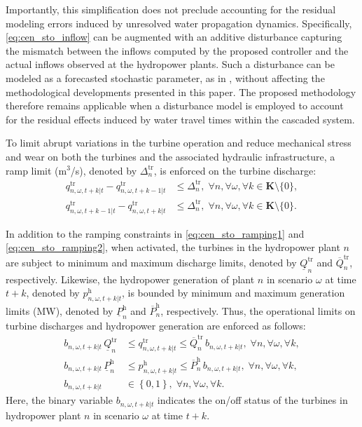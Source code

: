 \documentclass[a4paper,fleqn]{cas-sc}
\begin{document}
Importantly, this simplification does not preclude accounting for the residual modeling errors induced by unresolved water propagation dynamics.
Specifically, \eqref{eq:cen_sto_inflow} can be augmented with an additive disturbance capturing the mismatch between the inflows computed by the proposed controller and the actual inflows observed at the hydropower plants.
Such a disturbance can be modeled as a forecasted stochastic parameter, as in \cite{wu2025multi},
without affecting the methodological developments presented in this paper.
The proposed methodology therefore remains applicable when a disturbance model is employed to account for the residual effects induced by water travel times within the cascaded system.

To limit abrupt variations in the turbine operation and reduce mechanical stress and wear on both the turbines and the associated hydraulic infrastructure, a ramp limit (m$^3$/s), denoted by $\Delta^{\mathrm{tr}}_{n}$, is enforced on the turbine discharge:
\begin{align}
    q^{\mathrm{tr}}_{n, \omega, t+k|t} - q^{\mathrm{tr}}_{n, \omega, t+k-1|t} & \leq \Delta^{\mathrm{tr}}_{n}, \; \forall n, \forall \omega, \forall k \in \boldsymbol{K} \setminus \{0\}, \label{eq:cen_sto_ramping1}\\
    q^{\mathrm{tr}}_{n, \omega, t+k-1|t} - q^{\mathrm{tr}}_{n, \omega, t+k|t} & \leq \Delta^{\mathrm{tr}}_{n}, \; \forall n, \forall \omega, \forall k \in \boldsymbol{K} \setminus \{0\}. \label{eq:cen_sto_ramping2}
\end{align}

In addition to the ramping constraints in \eqref{eq:cen_sto_ramping1} and \eqref{eq:cen_sto_ramping2}, when activated, the turbines in the hydropower plant $n$ are subject to minimum and maximum discharge limits, denoted by $\underline{Q}^{\mathrm{tr}}_{n}$ and $\overline{Q}^{\mathrm{tr}}_{n}$, respectively.
Likewise, the hydropower generation of plant $n$ in scenario $\omega$ at time $t+k$, denoted by $p^{\mathrm{h}}_{n,\omega,t+k|t}$,
is bounded by minimum and maximum generation limits (MW), denoted by $\underline{P}^{\mathrm{h}}_{n}$ and $\overline{P}^{\mathrm{h}}_{n}$, respectively.
Thus, the operational limits on turbine discharges and hydropower generation are enforced as follows:
\begin{align}
    b_{n, \omega, t+k|t} \, \underline{Q}^{\mathrm{tr}}_{n} & \leq q^{\mathrm{tr}}_{n, \omega, t+k | t} \leq \overline{Q}^{\mathrm{tr}}_{n} \, b_{n, \omega, t+k|t}, \; \forall n, \forall \omega, \forall k, \label{eq:cen_sto_tr_lim}\\
    b_{n, \omega, t+k|t} \, \underline{P}^{\mathrm{h}}_{n} & \leq p^{\mathrm{h}}_{n, \omega, t+k | t} \leq \overline{P}^{\mathrm{h}}_{n} \, b_{n, \omega, t+k|t}, \; \forall n, \forall \omega, \forall k, \label{eq:cen_sto_ph_lim}\\
    b_{n, \omega, t+k|t} & \in \left\{0,1\right\}, \; \forall n, \forall \omega, \forall k. \label{eq:cen_sto_binary_lim}
\end{align}
Here, the binary variable $b_{n, \omega, t+k|t}$ indicates the on/off status of the turbines in hydropower plant $n$ in scenario $\omega$ at time $t+k$.
\end{document}
